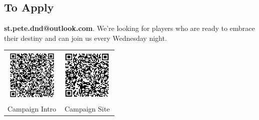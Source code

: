 \documentclass[a4paper, 8pt]{extarticle}
\begin{document}
\subsection*{\textbf{To Apply}}
\textcolor{DragonRed}{\textbf{st.pete.dnd@outlook.com}}. We're looking for players who are ready to embrace their destiny and can join us every Wednesday night.

\vspace{1cm}
\begin{table}[h!]
\centering
\begin{tabular}{cc}
\includegraphics[width=1in]{google_docs_qr_code_transparent.png} & \includegraphics[width=1in]{campaign_site_qr_code_transparent.png} \\
Campaign Intro & Campaign Site \\
\end{tabular}
\end{table}
\end{document}
